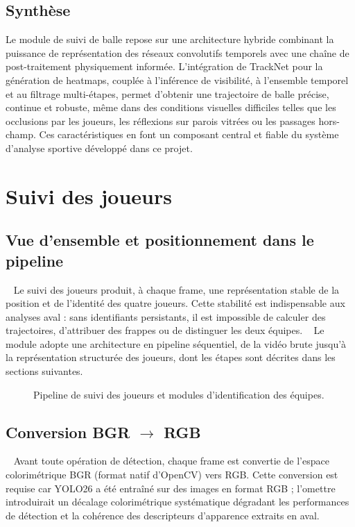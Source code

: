 \subsection{Synthèse}
\label{subsec:synthesis}
 
Le module de suivi de balle repose sur une architecture hybride
combinant la puissance de représentation des réseaux convolutifs
temporels avec une chaîne de post-traitement physiquement informée.
L'intégration de TrackNet pour la génération de heatmaps, couplée à
l'inférence de visibilité, à l'ensemble temporel et au filtrage
multi-étapes, permet d'obtenir une trajectoire de balle précise, continue
et robuste, même dans des conditions visuelles difficiles telles que les
occlusions par les joueurs, les réflexions sur parois vitrées ou les
passages hors-champ. Ces caractéristiques en font un composant central
et fiable du système d'analyse sportive développé dans ce projet.

\section{Suivi des joueurs}
\subsection{Vue d'ensemble et positionnement dans le pipeline}
 
Le suivi des joueurs produit, à chaque frame, une représentation stable
de la position et de l'identité des quatre joueurs.
Cette stabilité est indispensable aux analyses aval : sans identifiants
persistants, il est impossible de calculer des trajectoires, d'attribuer
des frappes ou de distinguer les deux équipes.
 
Le module adopte une architecture en pipeline séquentiel, de la vidéo
brute jusqu'à la représentation structurée des joueurs, dont les
étapes sont décrites dans les sections suivantes.

 \begin{figure}[H]
    \centering
    \caption{Pipeline de suivi des joueurs et modules d'identification des équipes.}
    \label{fig:pipeline_joueurs}
\end{figure}
\subsection{Conversion BGR \texorpdfstring{$\rightarrow$}{->} RGB}
 
Avant toute opération de détection, chaque frame est convertie de
l'espace colorimétrique BGR (format natif d'OpenCV) vers RGB.
Cette conversion est requise car YOLO26 a été entraîné sur des images
en format RGB ; l'omettre introduirait un décalage colorimétrique
systématique dégradant les performances de détection et la cohérence
des descripteurs d'apparence extraits en aval.
 
